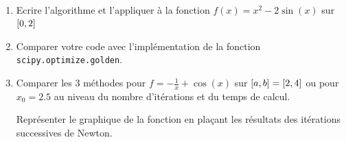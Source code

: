\begin{td-exo}\,
    \begin{enumerate}
        \item Ecrire l'algorithme et l'appliquer à la fonction \(f(x) = x^2 - 2\sin(x)\) sur \(\mathopen{}\left[0,2\right]\mathclose{}\)

        \item Comparer votre code avec l'implémentation de la fonction \texttt{scipy.optimize.golden}.

        \item Comparer les 3 méthodes pour \(f = -\frac1x +\cos(x)\) sur \(\mathopen{}\left[a,b\right]\mathclose{} = \mathopen{}\left[2,4\right]\mathclose{}\)
        ou pour \(x_0 = 2.5\) au niveau du nombre d'itérations et du temps de calcul.

        Représenter le graphique de la fonction en plaçant les résultats des itérations successives
        de Newton.
    \end{enumerate}
\end{td-exo}

